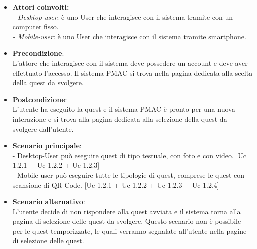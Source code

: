 \documentclass[10pt,a4paper]{article}
\begin{document}
\begin{itemize}

\item \textbf{Attori coinvolti:}\\
\emph{- Desktop-user}: è uno User che interagisce con il sistema tramite con un computer fisso.\\
\emph{- Mobile-user}: è uno User che interagisce con il sistema tramite smartphone.

\item \textbf{Precondizione}:\\
L'attore che interagisce con il sistema deve possedere un account e deve aver effettuato l'accesso. Il sistema PMAC si trova nella pagina dedicata alla scelta della quest da svolgere.

\item \textbf{Postcondizione}:\\
L'utente ha eseguito la quest e il sistema PMAC è pronto per una nuova interazione e si trova alla pagina dedicata alla selezione della quest da svolgere dall'utente.

\item \textbf{Scenario principale}:\\
- Desktop-User può eseguire quest di tipo testuale, con foto e con video. [Uc 1.2.1 + Uc 1.2.2 + Uc 1.2.3]\\
- Mobile-user può eseguire tutte le tipologie di quest, comprese le quest con scansione di QR-Code. [Uc 1.2.1 + Uc 1.2.2 + Uc 1.2.3 + Uc 1.2.4]

\item \textbf{Scenario alternativo}:\\
L'utente decide di non rispondere alla quest avviata e il sistema torna alla pagina di selezione delle quest da svolgere. Questo scenario non è possibile per le quest temporizzate, le quali verranno segnalate all'utente nella pagine di selezione delle quest.

\end{itemize}

\newpage
\end{document}
